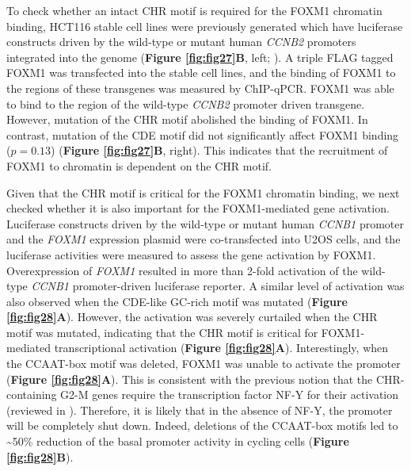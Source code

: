 To check whether an intact CHR motif is required for the FOXM1 chromatin binding, HCT116 stable cell lines were previously generated which have luciferase constructs driven by the wild-type or mutant human \textit{CCNB2} promoters integrated into the genome (\textbf{Figure \ref{fig:fig27}B}, left; \cite{müller2012the}). A triple FLAG tagged FOXM1 was transfected into the stable cell lines, and the binding of FOXM1 to the regions of these transgenes was measured by ChIP-qPCR. FOXM1 was able to bind to the region of the wild-type \textit{CCNB2} promoter driven transgene. However, mutation of the CHR motif abolished the binding of FOXM1. In contrast, mutation of the CDE motif did not significantly affect FOXM1 binding ($p=0.13$) (\textbf{Figure \ref{fig:fig27}B}, right). This indicates that the recruitment of FOXM1 to chromatin is dependent on the CHR motif.

Given that the CHR motif is critical for the FOXM1 chromatin binding, we next checked whether it is also important for the FOXM1-mediated gene activation. Luciferase constructs driven by the wild-type or mutant human \textit{CCNB1} promoter and the \textit{FOXM1} expression plasmid were co-transfected into U2OS cells, and the luciferase activities were measured to assess the gene activation by FOXM1. Overexpression of \textit{FOXM1} resulted in more than 2-fold activation of the wild-type \textit{CCNB1} promoter-driven luciferase reporter. A similar level of activation was also observed when the CDE-like GC-rich motif was mutated (\textbf{Figure \ref{fig:fig28}A}). However, the activation was severely curtailed when the CHR motif was mutated, indicating that the CHR motif is critical for FOXM1-mediated transcriptional activation (\textbf{Figure \ref{fig:fig28}A}). Interestingly, when the CCAAT-box motif was deleted, FOXM1 was unable to activate the promoter (\textbf{Figure \ref{fig:fig28}A}). This is consistent with the previous notion that the CHR-containing G2-M genes require the transcription factor NF-Y for their activation (reviewed in \cite{müller2010the}). Therefore, it is likely that in the absence of NF-Y, the promoter will be completely shut down. Indeed, deletions of the CCAAT-box motifs led to \textasciitilde 50\% reduction of the basal promoter activity in cycling cells (\textbf{Figure \ref{fig:fig28}B}).

